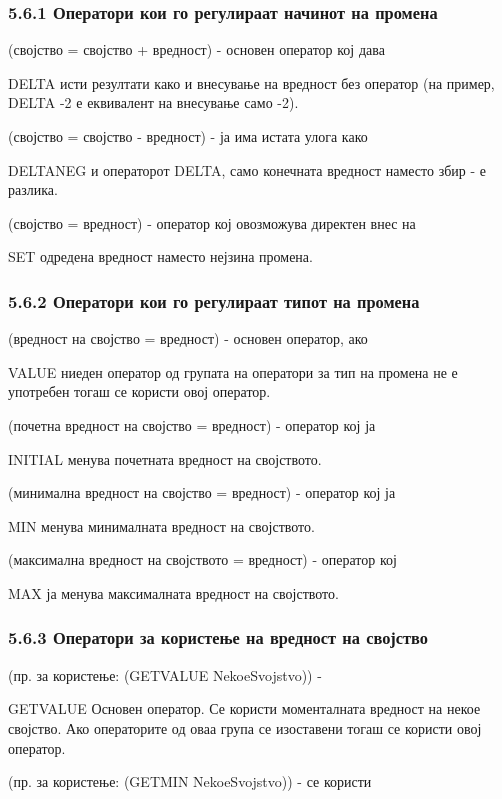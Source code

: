 \subsubsection{5.6.1 Оператори кои го регулираат начинот на промена}

(својство = својство + вредност) - основен оператор кој дава

DELTA исти резултати како и внесување на вредност без оператор (на пример, DELTA -2 е еквивалент на внесување само -2).

(својство = својство - вредност) - ја има истата улога како

DELTANEG и операторот DELTA, само конечната вредност наместо збир - е разлика.

(својство = вредност) - оператор кој овозможува директен внес на

SET одредена вредност наместо нејзина промена.

\subsubsection{5.6.2 Оператори кои го регулираат типот на промена}

(вредност на својство = вредност) - основен оператор, ако

VALUE ниеден оператор од групата на оператори за тип на промена не е употребен тогаш се користи овој оператор.

(почетна вредност на својство = вредност) - оператор кој ја

INITIAL менува почетната вредност на својството.

(минимална вредност на својство = вредност) - оператор кој ја

MIN менува минималната вредност на својството.

(максимална вредност на својството = вредност) - оператор кој

MAX ја менува максималната вредност на својството.

\subsubsection{5.6.3 Оператори за користење на вредност на својство}

(пр. за користење: (GETVALUE NekoeSvojstvo)) -

GETVALUE Основен оператор. Се користи моменталната вредност на некое својство. Ако операторите од оваа група се изоставени тогаш се користи овој оператор.

(пр. за користење: (GETMIN NekoeSvojstvo)) - се користи

